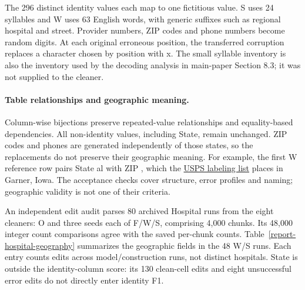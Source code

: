 \documentclass[10pt,a4paper]{article}
\begin{document}
The 296 distinct identity values each map to one fictitious value. S uses 24 syllables and W uses 63 English words, with generic suffixes such as {\ttfamily\small regional hospital} and {\ttfamily\small street}. Provider numbers, ZIP codes and phone numbers become random digits. At each original erroneous position, the transferred corruption replaces a character chosen by position with {\ttfamily\small x}. The small syllable inventory is also the inventory used by the decoding analysis in main-paper Section 8.3; it was not supplied to the cleaner.

\paragraph{Table relationships and geographic meaning.}
Column-wise bijections preserve repeated-value relationships and equality-based dependencies.
All non-identity values, including State, remain unchanged. ZIP codes and phones are generated
independently of those states, so the replacements do not preserve their geographic meaning.
For example, the first W reference row pairs State {\ttfamily al} with ZIP {},
which the \href{https://about.usps.com/postal-bulletin/2025/pb22691/html/info_001.htm}{USPS labeling list}
places in Garner, Iowa. The acceptance checks cover structure, error profiles and naming;
geographic validity is not one of their criteria.

An independent edit audit parses 80 archived Hospital runs from the eight cleaners: O and
three seeds each of F/W/S, comprising 4,000 chunks. Its 48,000 integer count comparisons
agree with the saved per-chunk counts. Table~\ref{report-hospital-geography} summarizes
the geographic fields in the 48 W/S runs. Each entry counts edits across model/construction
runs, not distinct hospitals. State is outside the identity-column score: its 130 clean-cell
edits and eight unsuccessful error edits do not directly enter identity F1.
\end{document}
